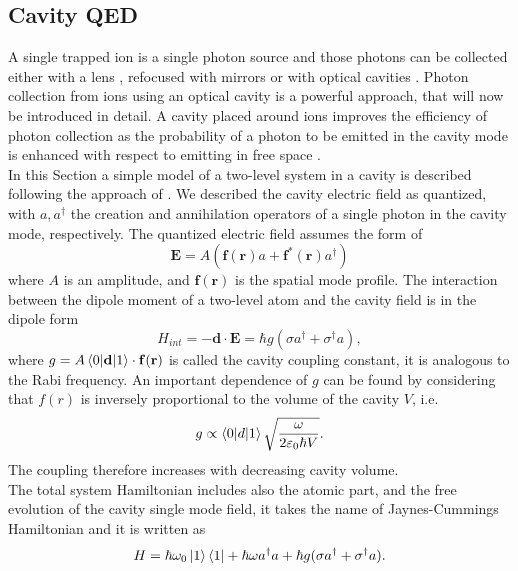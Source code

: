 \subsection{Cavity QED}
\label{sec:cavityqed}
A single trapped ion is a single photon source and those photons can be collected either with a lens \cite{ion_quantumnetwork}, refocused with mirrors \cite{PhysRevLett.120.193603} or with optical cavities \cite{Keller2004bis}. Photon collection from ions using an optical cavity is a powerful approach, that will now be introduced in detail. A cavity placed around ions improves the efficiency of photon collection as the probability of a photon to be emitted in the cavity mode is enhanced with respect to emitting in free space \cite{Kimble_1998}.\\
In this Section a simple model of a two-level system in a cavity is described following the approach of \cite{steck}. We described the cavity electric field as quantized, with $a,a^\dagger$ the creation and annihilation operators of a single photon in the cavity mode, respectively.
The quantized electric field assumes the form of
\begin{equation}
\mathbf{E} = A(\mathbf{f}(\mathbf{r})a + \mathbf{f}^*(\mathbf{r})a^\dagger)
\end{equation}
where $A$ is an amplitude, and $\mathbf{f}(\mathbf{r})$ is the spatial mode profile. The interaction between the dipole moment of a two-level atom and the cavity field is in the dipole form
\begin{equation}
H_{int}  = -\mathbf{d}\cdot \mathbf{E} = \hbar g (\sigma a^\dagger + \sigma^\dagger a),
\end{equation}
where $g = A \braket{0|\mathbf{d}|1}\cdot \mathbf{f}(\mathbf{r})$ is called the cavity coupling constant, it is analogous to the Rabi frequency. An important dependence of $g$ can be found by considering that $f(r)$ is inversely proportional to the volume of the cavity $V$, i.e.
\begin{equation}
g \propto \braket{0|d|1} \sqrt{\frac{\omega}{2\varepsilon_0 \hbar V}}.
\end{equation}
The coupling therefore increases with decreasing cavity volume.\\
The total system Hamiltonian includes also the atomic part, and the free evolution of the cavity single mode field, it takes the name of Jaynes-Cummings Hamiltonian and it is written as \cite{qedreview}
\begin{equation}
\label{eq:jchamiltonian}
H = \hbar \omega_0 \ket{1}\bra{1} + \hbar \omega a^\dagger a + \hbar g (\sigma a^\dagger + \sigma^\dagger a).
\end{equation}
